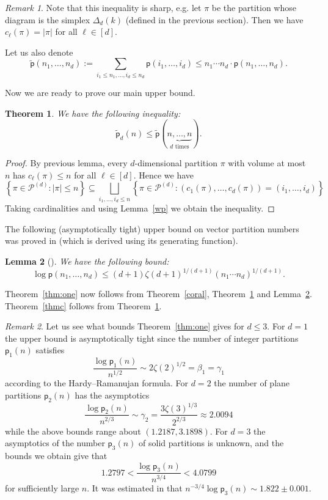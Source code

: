 \documentclass[12pt]{amsart}
\newtheorem{theorem}{Theorem}[section]
\newtheorem{lemma}[theorem]{Lemma}
\theoremstyle{definition}
\theoremstyle{remark}
\newtheorem{remark}{Remark}
\begin{document}
\begin{remark}
Note that this inequality is sharp, e.g. let $\pi$ be the partition whose diagram is the simplex $\Delta_d(k)$ (defined in the previous section). Then we have $c_{\ell}(\pi) = |\pi|$ for all $\ell \in [d]$.  
\end{remark}

Let us also denote
$$
\widetilde{\mathsf{p}}(n_1, \ldots, n_d) := \sum_{i_1 \le n_1, \ldots, i_d \le n_d} \mathsf{p}(i_1,\ldots, i_d) \le n_1 \cdots n_d \cdot \mathsf{p}(n_1,\ldots, n_d). 
$$

Now we are ready to prove our main upper bound. 
\begin{theorem}\label{lempp}
We have the following inequality:
$$
\widetilde{\mathsf{p}}_d(n) \le \widetilde{\mathsf{p}}(\underbrace{n, \ldots, n}_{d \text{ times}}).
$$
\end{theorem}
\begin{proof}
By previous lemma, every $d$-dimensional partition $\pi$ with volume at most $n$ has $c_{\ell}(\pi) \le n$ for all $\ell \in [d]$.
Hence we have 
$$
\left\{\pi \in \mathcal{P}^{(d)} : |\pi| \le n \right\} \subseteq \bigsqcup_{i_1,\ldots, i_d \le n} \left\{\pi \in \mathcal{P}^{(d)} : (c_1(\pi), \ldots, c_d(\pi)) = (i_1,\ldots, i_d) \right\}
$$
Taking cardinalities and using Lemma~\ref{wp} we obtain the inequality.
\end{proof}

The following (asymptotically tight) upper bound on vector partition numbers was proved in \cite{bv} (which is derived  using its generating function). 

\begin{lemma}[\cite{bv}]\label{lembv}
We have the following bound:
$$
\log \mathsf{p}(n_1,\ldots, n_d) \le (d+1) \zeta(d+1)^{1/(d+1)} (n_1 \cdots n_d)^{1/(d+1)}.
$$
\end{lemma}

Theorem~\ref{thm:one} now follows from Theorem~\ref{coral}, Theorem~\ref{lempp} and Lemma~\ref{lembv}. Theorem~\ref{thmc} follows from %
Theorem~\ref{lempp}.

\begin{remark}
Let us see what bounds Theorem~\ref{thm:one} gives for $d  \le 3$.
For $d = 1$ the upper bound is asymptotically tight since the number of integer partitions $\mathsf{p}_1(n)$ satisfies 
$$\frac{\log \mathsf{p}_1(n)}{n^{1/2}} \sim 2 \zeta(2)^{1/2} = \beta_1 = \gamma_1 $$ according to the Hardy--Ramanujan formula. %
For $d = 2$ the number of plane partitions $\mathsf{p}_2(n)$ has the asymptotics 
$$\frac{\log \mathsf{p}_2(n)}{n^{2/3}} \sim \gamma_2 = \frac{3 \zeta(3)^{1/3}}{2^{2/3}}  \approx 2.0094$$ %
while the above bounds range about $(1.2187, 3.1898)$. 
For $d = 3$ the asymptotics of the number $\mathsf{p}_3(n)$ of solid partitions is unknown, and the bounds we obtain give that
$$
1.2797 
< \frac{\log \mathsf{p}_{3}(n)}{n^{3/4}} < 
4.0799
$$
for sufficiently large $n$. It was estimated in \cite{dg} that 
$n^{-3/4}{\log \mathsf{p}_{3}(n)}{} \sim 1.822 \pm 0.001$.
\end{remark}
\end{document}
